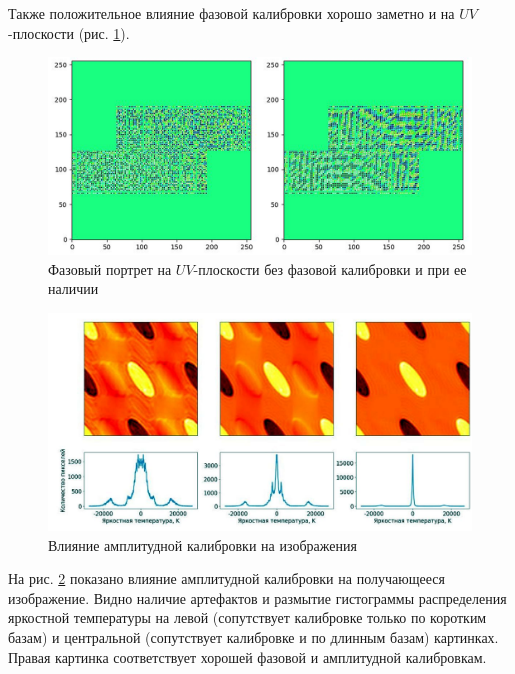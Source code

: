 Также положительное влияние фазовой калибровки хорошо заметно и на $UV$-плоскости (рис. \ref{fig:UV_notcalibandcalib}).

\begin{figure}[H]
	\centering
	\includegraphics[width=1\linewidth]{images/UV_notcalib_and_calib}
	\caption{Фазовый портрет на $UV$-плоскости без фазовой калибровки и при ее наличии}
	\label{fig:UV_notcalibandcalib}
\end{figure}

\begin{figure}[H]
	\centering
	\includegraphics[width=1\linewidth]{images/temp_calib}
	\caption{Влияние амплитудной калибровки на изображения}
	\label{fig:temp_calib}
\end{figure}

На рис. \ref{fig:temp_calib} показано влияние амплитудной калибровки на получающееся изображение. Видно наличие артефактов и размытие гистограммы распределения яркостной температуры на левой (сопутствует калибровке только по коротким базам) и центральной (сопутствует калибровке и по длинным базам) картинках. Правая картинка соответствует хорошей фазовой и амплитудной калибровкам.

